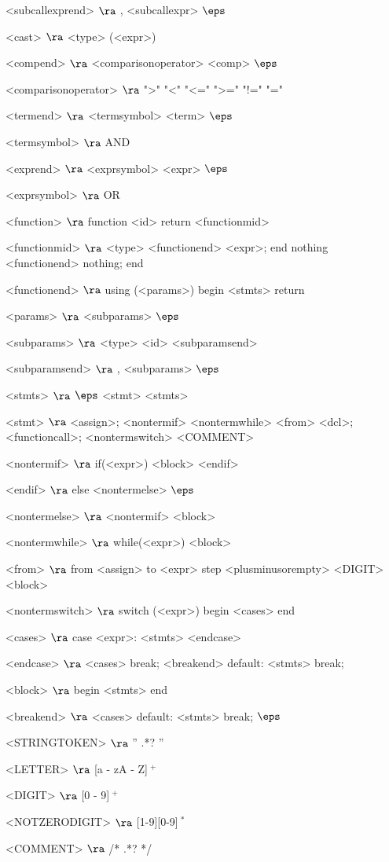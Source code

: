 \begin{grammar}
<subcallexprend> $\ra$ , <subcallexpr>
\alt$\eps$

<cast> $\ra$ <type> (<expr>)

<compend> $\ra$ <comparisonoperator> <comp>
\alt$\eps$

<comparisonoperator> $\ra$ ">"
				\alt "<"
				\alt "<="
				\alt ">="
				\alt "!="
				\alt "="

<termend> $\ra$ <termsymbol> <term>
\alt$\eps$

<termsymbol> $\ra$ AND 

<exprend> $\ra$ <exprsymbol> <expr>
\alt$\eps$

<exprsymbol> $\ra$ OR 

<function> $\ra$ function <id> return <functionmid>

<functionmid> $\ra$ <type> <functionend> <expr>; end
\alt nothing <functionend> nothing; end

<functionend> $\ra$
using (<params>)
begin
	<stmts>
	return

<params> $\ra$ <subparams>
	\alt$\eps$

<subparams> $\ra$ <type> <id> <subparamsend>

<subparamsend> $\ra$ , <subparams>
\alt$\eps$

<stmts> $\ra$ $\eps$
	\alt <stmt> <stmts>

<stmt> $\ra$ <assign>;
	\alt <nontermif>
	\alt <nontermwhile>
	\alt <from>
	\alt <dcl>;
	\alt <functioncall>;
	\alt <nontermswitch>
	\alt <COMMENT>
	
<nontermif> $\ra$ if(<expr>)
	<block>
	<endif>

<endif> $\ra$ 
	else <nontermelse>
	\alt$\eps$

<nontermelse> $\ra$ <nontermif>
	\alt <block>

<nontermwhile> $\ra$ while(<expr>)
		<block>
		
<from> $\ra$ from <assign> to <expr> step <plusminusorempty> <DIGIT>
	<block>

<nontermswitch> $\ra$ switch (<expr>)
		begin
			<cases>
		end

<cases> $\ra$ case <expr>:
			<stmts>
		<endcase>
		
<endcase> $\ra$ <cases>
		\alt break; <breakend>
		\alt default:
			<stmts>
			break;

<block> $\ra$ 
	begin
		<stmts>
	end

<breakend> $\ra$ <cases>
\alt default:
<stmts>
break;
\alt$\eps$

<STRINGTOKEN> $\ra$ '' .*? '' 

<LETTER> $\ra$ [a - zA - Z]$~^+$

<DIGIT> $\ra$ [0 - 9]$~^+$

<NOTZERODIGIT> $\ra$ [1-9][0-9]$~^*$

<COMMENT> $\ra$ /* .*? */


\end{grammar}